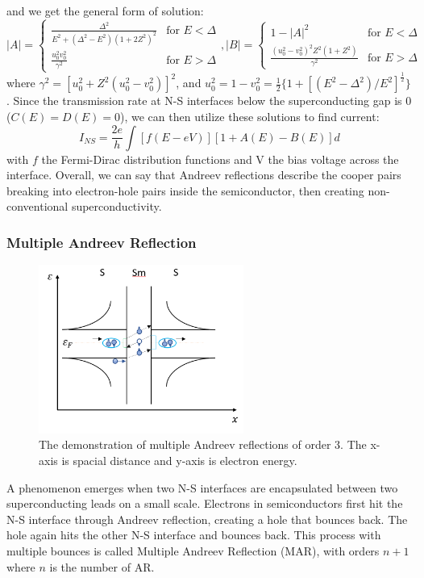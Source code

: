 and we get the general form of solution:
\begin{equation}
    |A| = \left\{
    \begin{array}{ll}
        \frac{\Delta^2}{E^2+(\Delta^2 - E^2)(1+2Z^2)^2}  & \text{for } E < \Delta \\
        \frac{u_0^2 v_0^2}{\gamma^2} & \text{for } E > \Delta
    \end{array},
    |B| = \left\{
    \begin{array}{ll}
       1 - |A|^2 & \text{for } E < \Delta\\
        \frac{(u_0^2 - v_0^2)^2 Z^2 (1+Z^2)}{\gamma^2}  & \text{for } E > \Delta
    \end{array}
\end{equation}
where $\gamma^2 = [u_0^2 + Z^2(u_0^2-v_0^2)]^2$, and $u_0^2 = 1-v_0^2 = \frac{1}{2}\{ 1+[(E^2 - \Delta^2)/E^2]^{\frac{1}{2}}\}$. Since the transmission rate at N-S interfaces below the superconducting gap is 0 ($C(E) = D(E) = 0$), we can then utilize these solutions to find current:
\begin{equation}
    I_{NS} = \frac{2e}{h}\int [f(E-eV)][1+A(E)-B(E)]d
\end{equation}
with $f$ the Fermi-Dirac distribution functions and V the bias voltage across the interface. Overall, we can say that Andreev reflections describe the cooper pairs breaking into electron-hole pairs inside the semiconductor, then creating non-conventional superconductivity\cite{RN10}.

\subsubsection{Multiple Andreev Reflection}
\begin{figure}[h!]
    \centering
    \includegraphics[width=0.6\textwidth]{Pic/MARs.png}
    \caption{The demonstration of multiple Andreev reflections of order 3. The x-axis is spacial distance and y-axis is electron energy.}
    \label{fig:my_label}
\end{figure}
A phenomenon emerges when two N-S interfaces are encapsulated between two superconducting leads on a small scale. Electrons in semiconductors first hit the N-S interface through Andreev reflection, creating a hole that bounces back. The hole again hits the other N-S interface and bounces back. This process with multiple bounces is called Multiple Andreev Reflection (MAR), with orders $n+1$ where $n$ is the number of AR.


